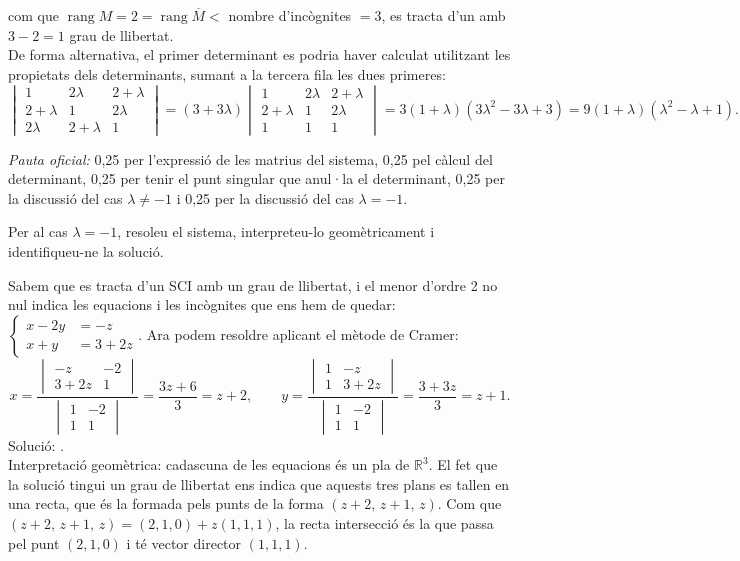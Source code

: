 \begin{apartats}
\begin{solucio}
com que $\operatorname{rang}M=2=\operatorname{rang}\overline{M}<$ nombre d'incògnites $=3$, es tracta d'un  amb $3-2=1$ grau de llibertat.\\
De forma alternativa, el primer determinant es podria haver calculat utilitzant les propietats dels determinants,
sumant a la tercera fila les dues primeres:
\[
\begin{vmatrix}1&2\lambda&2+\lambda\\2+\lambda&1&2\lambda\\2\lambda&2+\lambda&1\end{vmatrix}
=(3+3\lambda)\begin{vmatrix}1&2\lambda&2+\lambda\\2+\lambda&1&2\lambda\\1&1&1\end{vmatrix}
=3(1+\lambda)\left(3\lambda^2-3\lambda+3\right)=9(1+\lambda)\left(\lambda^2-\lambda+1\right).
\]

\textit{Pauta oficial:} 0,25 per l'expressió de les matrius del sistema, 0,25 pel càlcul del determinant, 0,25 per
tenir el punt singular que anul·la el determinant, 0,25 per la discussió del cas $\lambda\neq-1$ i 0,25 per la
discussió del cas $\lambda=-1$.
\end{solucio}

Per al cas $\lambda=-1$, resoleu el sistema, interpreteu-lo geomètricament i identifiqueu-ne la solució.

\begin{solucio}
Sabem que es tracta d'un SCI amb un grau de llibertat, i el menor d'ordre 2 no nul indica les equacions i les
incògnites que ens hem de quedar: $\left\{\begin{aligned}x-2y&=-z\\x+y&=3+2z\end{aligned}\right.$. Ara podem resoldre
aplicant el mètode de Cramer:
\[
x=\frac{\begin{vmatrix}-z&-2\\3+2z&1\end{vmatrix}}{\begin{vmatrix}1&-2\\1&1\end{vmatrix}}=\frac{3z+6}{3}=z+2,\qquad
y=\frac{\begin{vmatrix}1&-z\\1&3+2z\end{vmatrix}}{\begin{vmatrix}1&-2\\1&1\end{vmatrix}}=\frac{3+3z}{3}=z+1 .
\]
Solució: .\\
Interpretació geomètrica: cadascuna de les equacions és un pla de $\mathbb{R}^3$. El fet que la solució tingui un grau de
llibertat ens indica que aquests tres plans es tallen en una recta, que és la formada pels punts de la forma
$(z+2,\,z+1,\,z)$. Com que $(z+2,\,z+1,\,z)=(2,1,0)+z(1,1,1)$, la recta intersecció és la que passa pel punt $(2,1,0)$
i té vector director $(1,1,1)$.


\end{solucio}
\end{apartats}

